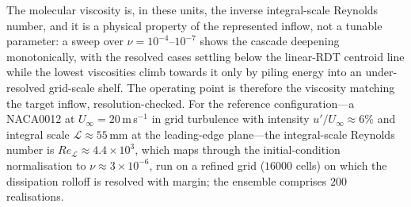 \documentclass[lineno]{JFM-FLM_Au}
\begin{document}
The molecular viscosity is, in these units, the inverse integral-scale
Reynolds number, and it is a physical property of the represented
inflow, not a tunable parameter: a sweep over
$\nu=10^{-4}$--$10^{-7}$ shows the cascade deepening monotonically, with
the resolved cases settling below the linear-RDT centroid line while the
lowest viscosities climb towards it only by piling energy into an
under-resolved grid-scale shelf. The operating point is therefore the
viscosity matching the target inflow, resolution-checked. For the
reference configuration---a NACA0012 at $U_\infty=20$\,m\,s$^{-1}$ in
grid turbulence with intensity $u'/U_\infty\approx6\%$ and integral
scale $\mathcal{L}\approx55$\,mm at the leading-edge plane---the
integral-scale Reynolds number is
$Re_{\mathcal{L}}\approx4.4\times10^3$, which maps through the
initial-condition normalisation to $\nu\approx3\times10^{-6}$, run on a
refined grid ($16000$ cells) on which the dissipation rolloff is
resolved with margin; the ensemble comprises $200$ realisations.
\end{document}
